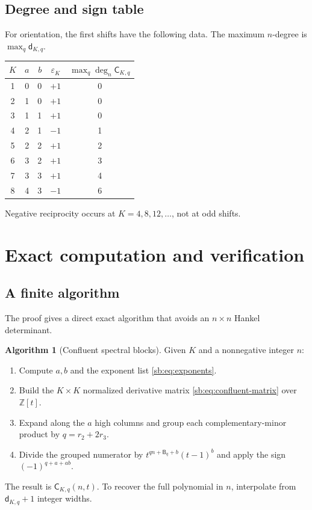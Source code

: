 \documentclass[11pt]{article}
\theoremstyle{definition}
\theoremstyle{remark}
\newcommand{\Z}{\mathbb Z}
\newcommand{\Cblock}{\mathsf C}
\newcommand{\Btri}{\mathsf B}
\newcommand{\dq}{\mathsf d}
\newcommand{\epsK}{\varepsilon}
\theoremstyle{definition}
\newtheorem{algorithm}[theorem]{Algorithm}
\theoremstyle{plain}
\numberwithin{equation}{section}
\begin{document}
\subsection{Degree and sign table}
For orientation, the first shifts have the following data.  The maximum
$n$-degree is $\max_q\dq_{K,q}$.
\begin{center}
\begin{tabular}{@{}crrcc@{}}
\toprule
$K$ & $a$ & $b$ & $\epsK_K$ & $\max_q\deg_n\Cblock_{K,q}$\\
\midrule
1&0&0&$+1$&0\\
2&1&0&$+1$&0\\
3&1&1&$+1$&0\\
4&2&1&$-1$&1\\
5&2&2&$+1$&2\\
6&3&2&$+1$&3\\
7&3&3&$+1$&4\\
8&4&3&$-1$&6\\
\bottomrule
\end{tabular}
\end{center}
Negative reciprocity occurs at $K=4,8,12,\ldots$, not at odd shifts.

\section{Exact computation and verification}
\label{sb:sec:verification}

\subsection{A finite algorithm}
The proof gives a direct exact algorithm that avoids an $n\times n$ Hankel
determinant.

\begin{algorithm}[Confluent spectral blocks]
\label{sb:alg:blocks}
Given $K$ and a nonnegative integer $n$:
\begin{enumerate}
\item Compute $a,b$ and the exponent list \eqref{sb:eq:exponents}.
\item Build the $K\times K$ normalized derivative matrix
      \eqref{sb:eq:confluent-matrix} over $\Z[t]$.
\item Expand along the $a$ high columns and group each complementary-minor
      product by $q=r_2+2r_3$.
\item Divide the grouped numerator by
      $t^{qn+\Btri_q+b}(t-1)^b$ and apply the sign
      $(-1)^{q+a+ab}$.
\end{enumerate}
The result is $\Cblock_{K,q}(n,t)$.  To recover the full polynomial in $n$,
interpolate from $\dq_{K,q}+1$ integer widths.
\end{algorithm}
\end{document}
